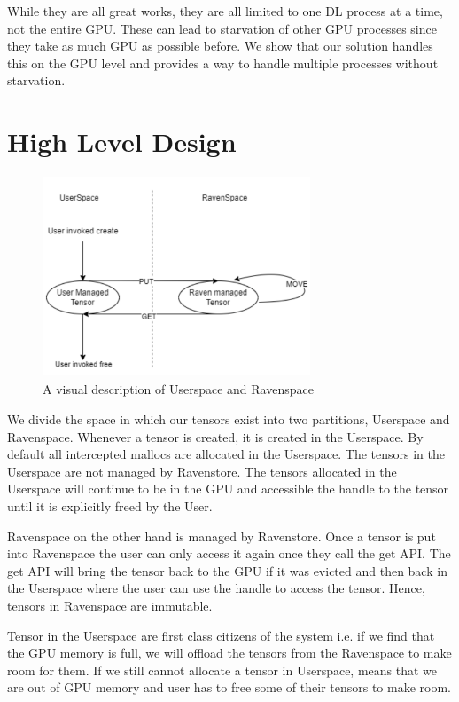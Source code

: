 \documentclass{article}
\begin{document}
While they are all great works, they are all limited to one DL process at a time, not the entire GPU. These can lead to starvation of other
GPU processes since they take as much GPU as possible before. We show that our solution handles this on the GPU level and provides a
way to handle multiple processes without starvation.


\section{High Level Design}
\begin{figure}[!htbp]
	\centering
	\includegraphics[height=6cm, width=8cm]{figures/ravenspace.png}
	\caption{A visual description of Userspace and Ravenspace}
\end{figure}
We divide the space in which our tensors exist into two partitions, Userspace and Ravenspace.
Whenever a tensor is created, it is created in the Userspace. By default all intercepted mallocs 
are allocated in the Userspace. The tensors in the Userspace are not managed by Ravenstore. 
The tensors allocated in the Userspace will continue to be in the GPU and accessible the handle to 
the tensor until it is explicitly freed by the User.

Ravenspace on the other hand is managed by Ravenstore. Once a tensor is put into Ravenspace the user
can only access it again once they call the get API. The get API will bring the tensor back to the GPU if it was evicted
and then back in the Userspace where the user can use the handle to access the tensor. Hence, tensors in 
Ravenspace are immutable.

Tensor in the Userspace are first class citizens of the system i.e. if we find that the GPU memory is full,
we will offload the tensors from the Ravenspace to make room for them. If we still cannot allocate a tensor in Userspace,
means that we are out of GPU memory and user has to free some of their tensors to make room.
\end{document}
